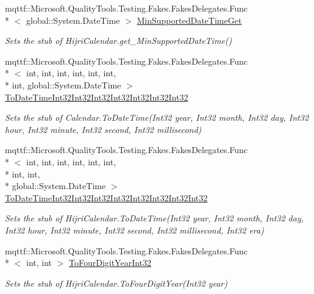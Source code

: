 \begin{DoxyCompactItemize}
mqttf\-::\-Microsoft.\-Quality\-Tools.\-Testing.\-Fakes.\-Fakes\-Delegates.\-Func\\*
$<$ global\-::\-System.\-Date\-Time $>$ \hyperlink{class_system_1_1_globalization_1_1_fakes_1_1_stub_hijri_calendar_a0f62a415fc3d09d67c8dc80476f15964}{Min\-Supported\-Date\-Time\-Get}
\begin{DoxyCompactList}\small\item\em Sets the stub of Hijri\-Calendar.\-get\-\_\-\-Min\-Supported\-Date\-Time()\end{DoxyCompactList}\item 
mqttf\-::\-Microsoft.\-Quality\-Tools.\-Testing.\-Fakes.\-Fakes\-Delegates.\-Func\\*
$<$ int, int, int, int, int, int, \\*
int, global\-::\-System.\-Date\-Time $>$ \hyperlink{class_system_1_1_globalization_1_1_fakes_1_1_stub_hijri_calendar_a95f139e14676cdbf6ce88877c7b25dbf}{To\-Date\-Time\-Int32\-Int32\-Int32\-Int32\-Int32\-Int32\-Int32}
\begin{DoxyCompactList}\small\item\em Sets the stub of Calendar.\-To\-Date\-Time(\-Int32 year, Int32 month, Int32 day, Int32 hour, Int32 minute, Int32 second, Int32 millisecond)\end{DoxyCompactList}\item 
mqttf\-::\-Microsoft.\-Quality\-Tools.\-Testing.\-Fakes.\-Fakes\-Delegates.\-Func\\*
$<$ int, int, int, int, int, int, \\*
int, int, \\*
global\-::\-System.\-Date\-Time $>$ \hyperlink{class_system_1_1_globalization_1_1_fakes_1_1_stub_hijri_calendar_a31540cf1ed0791aa76ea0318e0c9dc25}{To\-Date\-Time\-Int32\-Int32\-Int32\-Int32\-Int32\-Int32\-Int32\-Int32}
\begin{DoxyCompactList}\small\item\em Sets the stub of Hijri\-Calendar.\-To\-Date\-Time(\-Int32 year, Int32 month, Int32 day, Int32 hour, Int32 minute, Int32 second, Int32 millisecond, Int32 era)\end{DoxyCompactList}\item 
mqttf\-::\-Microsoft.\-Quality\-Tools.\-Testing.\-Fakes.\-Fakes\-Delegates.\-Func\\*
$<$ int, int $>$ \hyperlink{class_system_1_1_globalization_1_1_fakes_1_1_stub_hijri_calendar_a8d430d7360798c3b4ee7ce0994739593}{To\-Four\-Digit\-Year\-Int32}
\begin{DoxyCompactList}\small\item\em Sets the stub of Hijri\-Calendar.\-To\-Four\-Digit\-Year(\-Int32 year)\end{DoxyCompactList}\item 

\end{DoxyCompactItemize}
